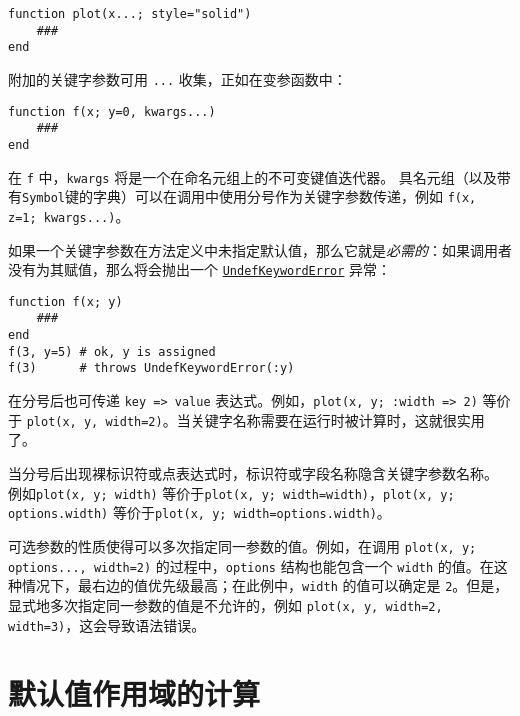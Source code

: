 \begin{verbatim}
function plot(x...; style="solid")
    ###
end
\end{verbatim}



附加的关键字参数可用 \texttt{...} 收集，正如在变参函数中：




\begin{verbatim}
function f(x; y=0, kwargs...)
    ###
end
\end{verbatim}



在 \texttt{f} 中，\texttt{kwargs} 将是一个在命名元组上的不可变键值迭代器。 具名元组（以及带有\texttt{Symbol}键的字典）可以在调用中使用分号作为关键字参数传递，例如 \texttt{f(x, z=1; kwargs...)}。



如果一个关键字参数在方法定义中未指定默认值，那么它就是\emph{必需的}：如果调用者没有为其赋值，那么将会抛出一个 \hyperlink{14325831233857471256}{\texttt{UndefKeywordError}} 异常：




\begin{verbatim}
function f(x; y)
    ###
end
f(3, y=5) # ok, y is assigned
f(3)      # throws UndefKeywordError(:y)
\end{verbatim}



在分号后也可传递 \texttt{key => value} 表达式。例如，\texttt{plot(x, y; :width => 2)} 等价于 \texttt{plot(x, y, width=2)}。当关键字名称需要在运行时被计算时，这就很实用了。



当分号后出现裸标识符或点表达式时，标识符或字段名称隐含关键字参数名称。 例如\texttt{plot(x, y; width)} 等价于\texttt{plot(x, y; width=width)}，\texttt{plot(x, y; options.width)} 等价于\texttt{plot(x, y; width=options.width)}。



可选参数的性质使得可以多次指定同一参数的值。例如，在调用 \texttt{plot(x, y; options..., width=2)} 的过程中，\texttt{options} 结构也能包含一个 \texttt{width} 的值。在这种情况下，最右边的值优先级最高；在此例中，\texttt{width} 的值可以确定是 \texttt{2}。但是，显式地多次指定同一参数的值是不允许的，例如 \texttt{plot(x, y, width=2, width=3)}，这会导致语法错误。



\hypertarget{5412457164020493169}{}


\section{默认值作用域的计算}



